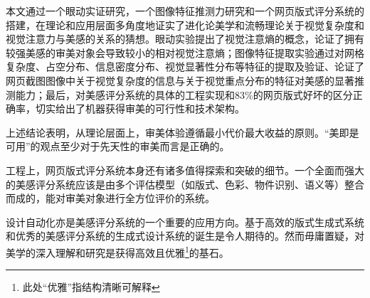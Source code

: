 
\begin{summary}

本文通过一个眼动实证研究，一个图像特征推测力研究和一个网页版式评分系统的搭建，在理论和应用层面多角度地证实了进化论美学和流畅理论关于视觉复杂度和视觉注意力与美感的关系的猜想。眼动实验提出了视觉注意熵的概念，论证了拥有较强美感的审美对象会导致较小的相对视觉注意熵；图像特征提取实验通过对网格复杂度、占空分布、信息密度分布、视觉显著性分布等特征的提取及验证、论证了网页截图图像中关于视觉复杂度的信息与关于视觉重点分布的特征对美感的显著推测能力；最后，对美感评分系统的具体的工程实现和83\%的网页版式好坏的区分正确率，切实给出了机器获得审美的可行性和技术架构。

上述结论表明，从理论层面上，审美体验遵循最小代价最大收益的原则\cite{Hekkert2006}。“美即是可用”\cite{Tractinsky2000}的观点至少对于先天性的审美而言是正确的。

工程上，网页版式评分系统本身还有诸多值得探索和突破的细节。一个全面而强大的美感评分系统应该是由多个评估模型（如版式、色彩、物件识别、语义等）整合而成的，能对审美对象进行全方位评价的系统。

设计自动化亦是美感评分系统的一个重要的应用方向。基于高效的版式生成式系统和优秀的美感评分系统的生成式设计系统的诞生是令人期待的。然而毋庸置疑，对美学的深入理解和研究是获得高效且优雅\footnote{此处“优雅”指结构清晰可解释}的基石。

\end{summary}
